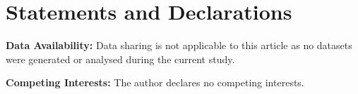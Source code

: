 \section*{Statements and Declarations}

\textbf{Data Availability:}  
Data sharing is not applicable to this article as no datasets were generated or analysed during the current study.

\textbf{Competing Interests:}  
The author declares no competing interests.

\printbibliography
